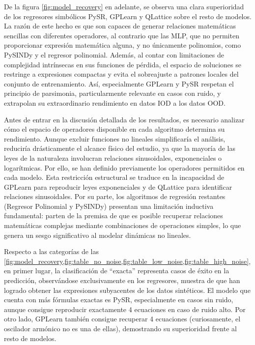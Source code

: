 \documentclass[11pt, a4paper]{article}
\begin{document}
De la figura \ref{fig:model_recovery} en adelante, se observa una clara superioridad de los regresores simbólicos PySR, GPLearn y QLattice sobre el resto de modelos. La razón de este hecho es que son capaces de generar relaciones matemáticas sencillas con diferentes operadores,
al contrario que las MLP, que no permiten proporcionar expresión matemática alguna, y no únicamente polinomios, como PySINDy y el regresor polinomial. Además, al contar con limitaciones de complejidad intrínsecas en sus funciones de pérdida, el espacio de soluciones se restringe a expresiones compactas y evita el sobreajuste a patrones locales del conjunto de entrenamiento. Así, especialmente GPLearn y PySR respetan el principio de parsimonia, particularmente relevante en casos con ruido, y extrapolan su extraordinario rendimiento en datos IOD a los datos OOD.

Antes de entrar en la discusión detallada de los resultados, es necesario analizar cómo el espacio de operadores disponible en cada algoritmo determina su rendimiento. Aunque excluir funciones no lineales simplificaría el análisis, reduciría drásticamente el alcance físico del estudio, ya que la mayoría de las leyes de la naturaleza involucran relaciones sinusoidales, exponenciales o logarítmicas. Por ello, se han definido previamente los operadores permitidos en cada modelo. Esta restricción estructural se traduce en la incapacidad de GPLearn para reproducir leyes exponenciales y de QLattice para identificar relaciones sinusoidales. Por su parte, los algoritmos de regresión restantes (Regresor Polinomial y PySINDy) presentan una limitación inductiva fundamental: parten de la premisa de que es posible recuperar relaciones matemáticas complejas mediante combinaciones de operaciones simples, lo que genera un sesgo significativo al modelar dinámicas no lineales.

Respecto a las categorías de las \cref{fig:model_recovery,fig:table_no_noise,fig:table_low_noise,fig:table_high_noise}, en primer lugar, la clasificación de ``exacta'' representa casos de éxito en la predicción, observándose exclusivamente en los regresores, muestra de que han logrado obtener las expresiones subyacentes de los datos sintéticos. El modelo que cuenta con más fórmulas exactas es PySR, especialmente en casos sin ruido, aunque consigue reproducir exactamente 4 ecuaciones en caso de ruido alto. Por otro lado, GPLearn también consigue recuperar 4 ecuaciones (curiosamente, el oscilador armónico no es una de ellas), demostrando su superioridad frente al resto de modelos.
\end{document}
